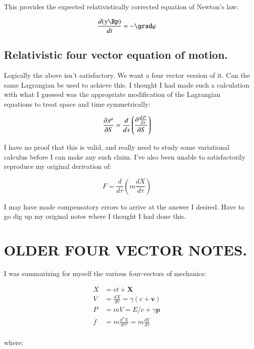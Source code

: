 \documentclass{article}      %
\begin{document}
This provides the expected relativistically corrected equation of Newton's law:

\begin{equation}
\frac{d (\gamma \Bp)}{dt} = -\grad \varphi
\end{equation}

\subsection{Relativistic four vector equation of motion. }

Logically the above isn't satisfactory.  We want a four vector version of it.  Can the same Lagrangian
be used to achieve this.  I thought I had made such a calculation with what I guessed was the appropriate
modification of the Lagrangian equations to treat space and time symmetrically:

\begin{equation}
\PD{S}{x^{\mu}} = \frac{d}{ds} \left( \PD{S}{\frac{d x^{\mu}}{ds}} \right)
\end{equation}

I have no proof that this is valid, and really need to study some variational calculus before I can make any
such claim.  I've also been unable to satisfactorily reproduce my original derivation of:

\begin{equation}
F = \frac{d}{d\tau}\left( m\frac{dX}{d\tau} \right)
\end{equation}

I may have made compensatory errors to arrive at the answer I desired.  Have to go dig up my original notes
where I thought I had done this.

\section{OLDER FOUR VECTOR NOTES. }

I was summarizing for myself the various four-vectors of mechanics:

\begin{align*}
X &= ct + \mathbf{X} \\
V &= \frac{d X}{d\tau} = \gamma(c + \mathbf{v}) \\
P &= m V = E/c + \gamma\mathbf{p} \\
f &= m\frac{d^2 X}{d\tau^2} = m\frac{d V}{d\tau} \\
\end{align*}

where:
\end{document}
